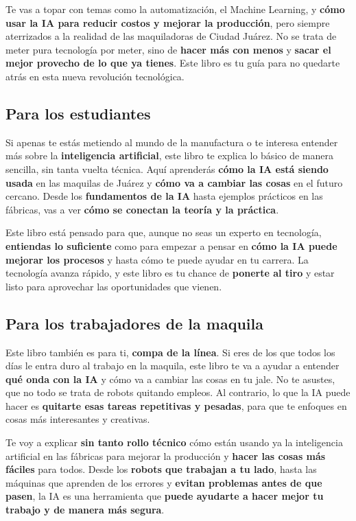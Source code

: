 Te vas a topar con temas como la automatización, el Machine Learning, y \textbf{cómo usar la IA para reducir costos y mejorar la producción}, pero siempre aterrizados a la realidad de las maquiladoras de Ciudad Juárez. No se trata de meter pura tecnología por meter, sino de \textbf{hacer más con menos} y \textbf{sacar el mejor provecho de lo que ya tienes}. Este libro es tu guía para no quedarte atrás en esta nueva revolución tecnológica.

\subsection{Para los estudiantes}
Si apenas te estás metiendo al mundo de la manufactura o te interesa entender más sobre la \textbf{inteligencia artificial}, este libro te explica lo básico de manera sencilla, sin tanta vuelta técnica. Aquí aprenderás \textbf{cómo la IA está siendo usada} en las maquilas de Juárez y \textbf{cómo va a cambiar las cosas} en el futuro cercano. Desde los \textbf{fundamentos de la IA} hasta ejemplos prácticos en las fábricas, vas a ver \textbf{cómo se conectan la teoría y la práctica}.

Este libro está pensado para que, aunque no seas un experto en tecnología, \textbf{entiendas lo suficiente} como para empezar a pensar en \textbf{cómo la IA puede mejorar los procesos} y hasta cómo te puede ayudar en tu carrera. La tecnología avanza rápido, y este libro es tu chance de \textbf{ponerte al tiro} y estar listo para aprovechar las oportunidades que vienen.

\subsection{Para los trabajadores de la maquila}
Este libro también es para ti, \textbf{compa de la línea}. Si eres de los que todos los días le entra duro al trabajo en la maquila, este libro te va a ayudar a entender \textbf{qué onda con la IA} y cómo va a cambiar las cosas en tu jale. No te asustes, que no todo se trata de robots quitando empleos. Al contrario, lo que la IA puede hacer es \textbf{quitarte esas tareas repetitivas y pesadas}, para que te enfoques en cosas más interesantes y creativas.

Te voy a explicar \textbf{sin tanto rollo técnico} cómo están usando ya la inteligencia artificial en las fábricas para mejorar la producción y \textbf{hacer las cosas más fáciles} para todos. Desde los \textbf{robots que trabajan a tu lado}, hasta las máquinas que aprenden de los errores y \textbf{evitan problemas antes de que pasen}, la IA es una herramienta que \textbf{puede ayudarte a hacer mejor tu trabajo y de manera más segura}.

